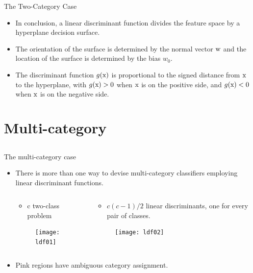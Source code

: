 \begin{frame}{The Two-Category Case}
\begin{itemize}
\item In conclusion, a linear discriminant function divides the feature space by a hyperplane decision surface.
\item The orientation of the surface is determined by the normal vector ${\rm w}$ and the location of the surface is determined by the bias $w_0$.
\item The discriminant function $g({\rm x})$ is proportional to the signed distance from ${\rm x}$ to the hyperplane, with $g({\rm x})>0$ when ${\rm x}$ is on the positive side, and $g({\rm x})<0$ when ${\rm x}$ is on the negative side.
\end{itemize}
\end{frame}

\section{Multi-category}
\subsection{}
\begin{frame}{The multi-category case}
\begin{itemize}
\item There is more than one way to devise multi-category classifiers employing linear discriminant functions.
\begin{columns}
\begin{column}{4cm}
\begin{itemize}
\item c two-class problem
\end{itemize}
\begin{figure}
\texttt{[image: ldf01]}
\end{figure}
\end{column}
\begin{column}{5cm}
\begin{itemize}
\item $c(c-1)/2$ linear discriminants, one for every pair of classes.
\end{itemize}
\begin{figure}
\texttt{[image: ldf02]}
\end{figure}
\end{column}
\end{columns}

\item Pink regions have ambiguous category assignment.
\end{itemize}
\end{frame}

